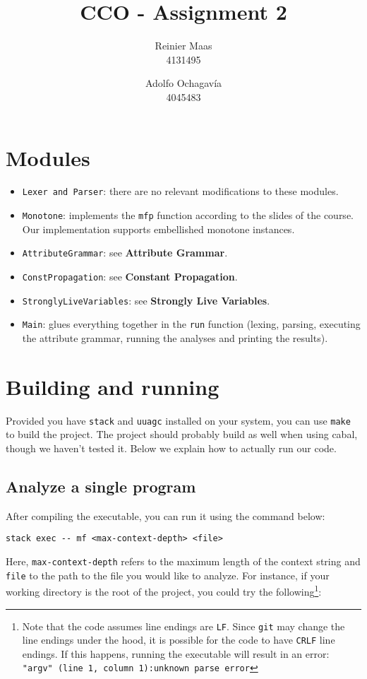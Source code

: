\documentclass{article}
\author{
  Reinier Maas \\ 4131495
  \and
  Adolfo Ochagavía \\ 4045483
}
\title{CCO - Assignment 2}
\begin{document}
\maketitle

\section{Modules}

\begin{itemize}
\item \texttt{Lexer and Parser}: there are no relevant modifications to these modules.
\item \texttt{Monotone}: implements the \texttt{mfp} function according to the slides of the course. Our implementation supports embellished monotone instances.
\item \texttt{AttributeGrammar}: see \textbf{Attribute Grammar}.
\item \texttt{ConstPropagation}: see \textbf{Constant Propagation}.
\item \texttt{StronglyLiveVariables}: see \textbf{Strongly Live Variables}.
\item \texttt{Main}: glues everything together in the \texttt{run} function (lexing, parsing, executing the attribute grammar, running the analyses and printing the results).
\end{itemize}

\section{Building and running}

Provided you have \texttt{stack} and \texttt{uuagc} installed on your system, you can use \texttt{make} to build the project.
The project should probably build as well when using cabal, though we haven't tested it.
Below we explain how to actually run our code.

\subsection*{Analyze a single program}

After compiling the executable, you can run it using the command below:

\begin{verbatim}
stack exec -- mf <max-context-depth> <file>
\end{verbatim}

Here, \texttt{max-context-depth} refers to the maximum length of the context string and \texttt{file} to the path to the file you would like to analyze. For instance, if your working directory is the root of the project, you could try the following\footnote{Note that the code assumes line endings are \texttt{LF}. Since \texttt{git} may change the line endings under the hood, it is possible for the code to have \texttt{CRLF} line endings. If this happens, running the executable will result in an error: \texttt{"argv" (line 1, column 1):unknown parse error}}:
\end{document}
